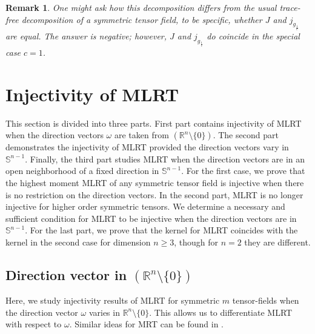 \documentclass[11pt,a4paper,reqno]{amsart}
\newtheorem{remark}[definition]{Remark}
\newcommand{\R}{\mathbb{R}}
\newcommand{\om}{\omega}
\newcommand{\sn}{\mathbb{S}^{n-1}}
\begin{document}
	\begin{remark}
One might ask how this decomposition differs from the usual trace-free decomposition of a symmetric tensor field, to be specific, whether \( J \) and \( j_{g_{\frac{1}{c}}} \) are equal. The answer is negative; however, \( J \) and \( j_{g_{\frac{1}{c}}} \) do coincide in the special case \( c = 1 \).
	\end{remark}

	\section{Injectivity of MLRT}\label{sec:injectivity with full data}
	This section is divided into three parts. First part contains injectivity of MLRT when the direction vectors $\om$ are taken from $(\R^{n}\setminus\{0\})$. The second part demonstrates the injectivity of MLRT provided the direction vectors vary in $\sn$. Finally, the third part studies MLRT when the direction vectors are in an open neighborhood of a fixed direction in $\sn$. For the first case, we prove that the highest moment MLRT of any symmetric tensor field is injective when there is no restriction on the direction vectors. In the second part, MLRT is no longer injective for higher order symmetric tensors. We determine a necessary and sufficient condition for MLRT to be injective when the direction vectors are in $\sn$. For the last part, we prove that the kernel for MLRT coincides with the kernel in the second case for dimension $n \geq 3$, though for $n=2$ they are different.
	
	\subsection{Direction vector in $(\R^n\setminus\{0\})$}\label{Sub-section3.1}
	Here, we study injectivity results of MLRT for symmetric $m$ tensor-fields when the direction vector $\omega$ varies in $\mathbb{R}^{n}\setminus\{0\}$. This allows us to differentiate MLRT with respect to $\omega$. Similar ideas for MRT can  be found in \cite{krishnan2018momentum}.
	
\end{document}
